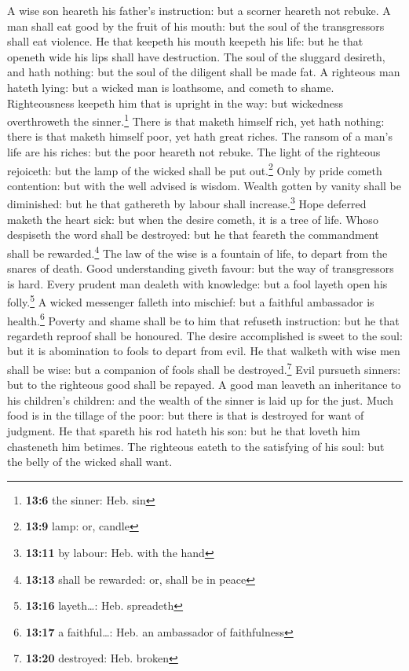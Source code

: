  A wise son heareth his father's instruction: but a
scorner heareth not rebuke.  A man shall eat good by the
fruit of his mouth: but the soul of the transgressors shall eat
violence.  He that keepeth his mouth keepeth his life: but
he that openeth wide his lips shall have destruction.  The
soul of the sluggard desireth, and hath nothing: but the soul of the
diligent shall be made fat.  A righteous man hateth lying:
but a wicked man is loathsome, and cometh to shame. 
Righteousness keepeth him that is upright in the way: but wickedness
overthroweth the sinner.\footnote{\textbf{13:6} the sinner: Heb. sin}
 There is that maketh himself rich, yet hath nothing:
there is that maketh himself poor, yet hath great riches. 
The ransom of a man's life are his riches: but the poor heareth not
rebuke.  The light of the righteous rejoiceth: but the
lamp of the wicked shall be put out.\footnote{\textbf{13:9} lamp: or,
  candle}  Only by pride cometh contention: but with the
well advised is wisdom.  Wealth gotten by vanity shall be
diminished: but he that gathereth by labour shall increase.\footnote{\textbf{13:11}
  by labour: Heb. with the hand}  Hope deferred maketh
the heart sick: but when the desire cometh, it is a tree of life.
 Whoso despiseth the word shall be destroyed: but he that
feareth the commandment shall be rewarded.\footnote{\textbf{13:13} shall
  be rewarded: or, shall be in peace}  The law of the
wise is a fountain of life, to depart from the snares of death.
 Good understanding giveth favour: but the way of
transgressors is hard.  Every prudent man dealeth with
knowledge: but a fool layeth open his folly.\footnote{\textbf{13:16}
  layeth\ldots: Heb. spreadeth}  A wicked messenger
falleth into mischief: but a faithful ambassador is health.\footnote{\textbf{13:17}
  a faithful\ldots: Heb. an ambassador of faithfulness} 
Poverty and shame shall be to him that refuseth instruction: but he that
regardeth reproof shall be honoured.  The desire
accomplished is sweet to the soul: but it is abomination to fools to
depart from evil.  He that walketh with wise men shall be
wise: but a companion of fools shall be destroyed.\footnote{\textbf{13:20}
  destroyed: Heb. broken}  Evil pursueth sinners: but to
the righteous good shall be repayed.  A good man leaveth
an inheritance to his children's children: and the wealth of the sinner
is laid up for the just.  Much food is in the tillage of
the poor: but there is that is destroyed for want of judgment.
 He that spareth his rod hateth his son: but he that
loveth him chasteneth him betimes.  The righteous eateth
to the satisfying of his soul: but the belly of the wicked shall want.

